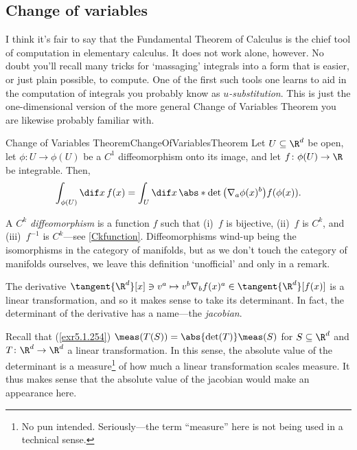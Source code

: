 \subsection{Change of variables}

I think it's fair to say that the Fundamental Theorem of Calculus is the chief tool of computation in elementary calculus.  It does not work alone, however.  No doubt you'll recall many tricks for `massaging' integrals into a form that is easier, or just plain possible, to compute.  One of the first such tools one learns to aid in the computation of integrals you probably know as \emph{$u$-substitution}.  This is just the one-dimensional version of the more general Change of Variables Theorem you are likewise probably familiar with.
\begin{thm}{Change of Variables Theorem}{ChangeOfVariablesTheorem}
Let $U\subseteq \R ^d$ be open, let $\phi \colon U\rightarrow \phi (U)$ be a $C^1$ diffeomorphism onto its image, and let $f\colon \phi (U)\rightarrow \R$ be integrable.  Then,
\begin{equation}
\int _{\phi (U)}\dif x\, f(x)=\int _U\dif x\, \abs*{\det \left( \nabla _a\phi (x)^b\right) }f(\phi (x)).
\end{equation}
\begin{rmk}
A \emph{$C^k$ diffeomorphism} is a function $f$ such that (i)~$f$ is bijective, (ii)~$f$ is $C^k$, and (iii)~$f^{-1}$ is $C^k$---see \cref{Ckfunction}.  Diffeomorphisms wind-up being the isomorphisms in the category of manifolds, but as we don't touch the category of manifolds ourselves, we leave this definition `unofficial' and only in a remark.
\end{rmk}
\begin{rmk}
The derivative $\tangent{\R ^d}[x]\ni v^a\mapsto v^b\nabla _bf(x)^a\in \tangent{\R ^d}[f(x)]$ is a linear transformation, and so it makes sense to take its determinant.  In fact, the determinant of the derivative has a name---the \emph{jacobian}.
\end{rmk}
\begin{rmk}
Recall that (\cref{exr5.1.254}) $\meas (T(S))=\abs{\det (T)}\meas (S)$ for $S\subseteq \R ^d$ and $T\colon \R ^d\rightarrow \R ^d$ a linear transformation.  In this sense, the absolute value of the determinant is a measure\footnote{No pun intended.  Seriously---the term ``measure'' here is not being used in a technical sense.} of how much a linear transformation scales measure.  It thus makes sense that the absolute value of the jacobian would make an appearance here.

\end{rmk}
\end{thm}
